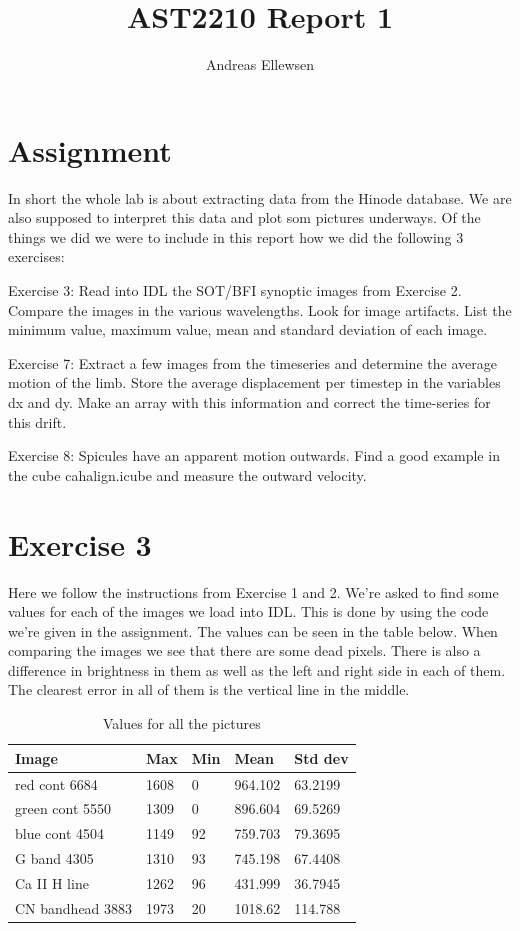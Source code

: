 \documentclass[a4paper,10pt]{report}
\title{AST2210 Report 1}
\author{Andreas Ellewsen}
\begin{document}
\maketitle

\section{Assignment}
In short the whole lab is about extracting data from the Hinode database. 
We are also supposed to interpret this data and plot som pictures underways.
Of the things we did we were to include in this report how we did the following 3 exercises:

Exercise 3:
Read into IDL the SOT/BFI synoptic images from Exercise 2.
Compare the images in the various wavelengths. Look for image artifacts. List the
minimum value, maximum value, mean and standard deviation of each image.

Exercise 7:
Extract a few images from the timeseries and determine the average
motion of the limb. Store the average displacement per timestep in the variables
dx and dy. Make an array with this information and correct the time-series for this
drift.

Exercise 8:
Spicules have an apparent motion outwards. Find a good example in the cube cahalign.icube and measure the outward velocity.

\section{Exercise 3}

Here we follow the instructions from Exercise 1 and 2. We're asked to find some values for each of the images we load into IDL.
This is done by using the code we're given in the assignment. The values can be seen in the table below. When comparing the images
we see that there are some dead pixels. There is also a difference in brightness in them as well as the left and right side in each of them. 
The clearest error in all of them is the vertical line in the middle.

\begin{table}[h!]
\center
\begin{tabular}{|l|l|l|l|l|}
\hline
Image			&Max	&Min	&Mean	&Std dev\\
\hline
red cont 6684		&1608	&0	&964.102&63.2199\\
green cont 5550		&1309	&0	&896.604&69.5269\\
blue cont 4504		&1149	&92	&759.703&79.3695\\
G band 4305		&1310	&93	&745.198&67.4408\\
Ca II H line		&1262	&96	&431.999&36.7945\\
CN bandhead 3883	&1973	&20	&1018.62&114.788\\
\hline
\end{tabular}
\caption{Values for all the pictures}
\end{table}
\end{document}
